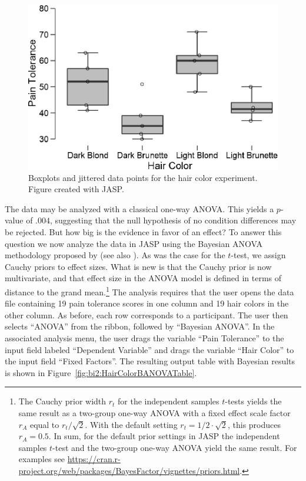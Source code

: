 \begin{figure}[tp]
    \begin{center}
        \includegraphics[width=.65\textwidth]{figs/bi2_HairColorBoxPlot.eps}
        \caption{Boxplots and jittered data points for the hair color experiment. Figure created with JASP.} \label{fig:bi2:HairColorBoxPlot}
    \end{center}
\end{figure}

The data may be analyzed with a classical one-way ANOVA. This yields a $p$-value of $.004$, suggesting that the null hypothesis of no condition differences may be rejected. But how big is the evidence in favor of an effect? To answer this question we now analyze the data in JASP using the Bayesian ANOVA methodology proposed by  (see also ). As was the case for the $t$-test, we assign Cauchy priors to effect sizes. What is new is that the Cauchy prior is now multivariate, and that effect size in the ANOVA model is defined in terms of distance to the grand mean.\footnote{The Cauchy prior width $r_t$ for the independent samples $t$-tests yields the same result as a two-group one-way ANOVA with a fixed effect scale factor $r_A$ equal to $r_t/\sqrt{2}$. With the default setting $r_t=1/2 \cdot \sqrt{2}$, this produces $r_A = 0.5$. In sum, for the default prior settings in JASP the independent samples $t$-test and the two-group one-way ANOVA yield the same result. For examples see \url{https://cran.r-project.org/web/packages/BayesFactor/vignettes/priors.html}.} The analysis requires that the user opens the data file containing 19 pain tolerance scores in one column and 19 hair colors in the other column. As before, each row corresponds to a participant. The user then selects ``ANOVA'' from the ribbon, followed by ``Bayesian ANOVA''. In the associated analysis menu, the user drags the variable ``Pain Tolerance'' to the input field labeled ``Dependent Variable'' and drags the variable ``Hair Color'' to the input field ``Fixed Factors''. The resulting output table with Bayesian results is shown in Figure~\ref{fig:bi2:HairColorBANOVATable}.


